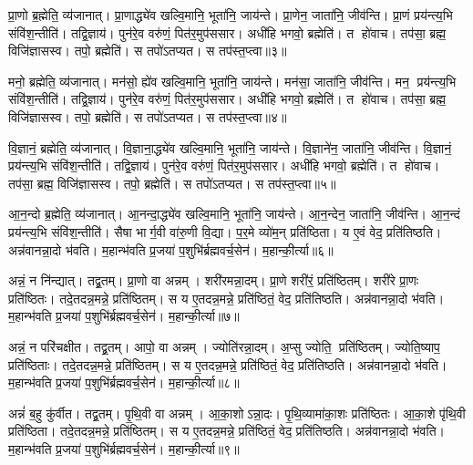 प्रा॒णो ब्र॒ह्मेति॒ व्य॑जानात्। प्रा॒णाद्ध्ये॑व खल्वि॒मानि॒ भूता॑नि॒ जाय॑न्ते। प्रा॒णेन॒ जाता॑नि॒ जीव॑न्ति। प्रा॒णं प्रय॑न्त्य॒भि  संवि॑श॒न्तीति॑। तद्वि॒ज्ञाय॑। पुन॑रे॒व वरु॑णं॒ पित॑र॒मुप॑ससार। अधी॑हि भगवो॒ ब्रह्मेति॑। त हो॑वाच। तप॑सा॒ ब्रह्म॒ विजि॑ज्ञासस्व। तपो॒ ब्रह्मेति॑। स तपो॑ऽतप्यत। स तप॑स्त॒प्त्वा॥३॥

मनो॒ ब्रह्मेति॒ व्य॑जानात्। मन॑सो॒ ह्ये॑व खल्वि॒मानि॒ भूता॑नि॒ जाय॑न्ते। मन॑सा॒ जाता॑नि॒ जीव॑न्ति। मन॒ प्रय॑न्त्य॒भि  संवि॑श॒न्तीति॑। तद्वि॒ज्ञाय॑। पुन॑रे॒व वरु॑णं॒ पित॑र॒मुप॑ससार। अधी॑हि भगवो॒ ब्रह्मेति॑। त हो॑वाच। तप॑सा॒ ब्रह्म॒ विजि॑ज्ञासस्व। तपो॒ ब्रह्मेति॑। स तपो॑ऽतप्यत। स तप॑स्त॒प्त्वा॥४॥

वि॒ज्ञानं॒ ब्रह्मेति॒ व्य॑जानात्। वि॒ज्ञाना॒द्ध्ये॑व खल्वि॒मानि॒ भूता॑नि॒ जाय॑न्ते। वि॒ज्ञाने॑न॒ जाता॑नि॒ जीव॑न्ति। वि॒ज्ञानं॒ प्रय॑न्त्य॒भि संवि॑श॒न्तीति॑। तद्वि॒ज्ञाय॑। पुन॑रे॒व वरु॑णं॒ पित॑र॒मुप॑ससार। अधी॑हि भगवो॒ ब्रह्मेति॑। त हो॑वाच। तप॑सा॒ ब्रह्म॒ विजि॑ज्ञासस्व। तपो॒ ब्रह्मेति॑। स तपो॑ऽतप्यत। स तप॑स्त॒प्त्वा॥५॥

आ॒न॒न्दो ब्र॒ह्मेति॒ व्य॑जानात्। आ॒नन्दा॒द्ध्ये॑व खल्वि॒मानि॒ भूता॑नि॒ जाय॑न्ते। आ॒न॒न्देन॒ जाता॑नि॒ जीव॑न्ति। आ॒न॒न्दं प्रय॑न्त्य॒भि संवि॑श॒न्तीति॑। सैषा भार्ग॒वी वा॑रु॒णी वि॒द्या। प॒र॒मे व्यो॑म॒न् प्रति॑ष्ठिता। य ए॒वं वेद॒ प्रति॑तिष्ठति। अन्न॑वानन्ना॒दो भ॑वति। म॒हान्भ॑वति प्र॒जया॑ प॒शुभि॑र्ब्रह्मवर्च॒सेन॑। म॒हान्की॒र्त्या॥६॥

अन्नं॒ न नि॑न्द्यात्। तद्व्र॒तम्। प्रा॒णो वा अन्नम्। शरी॑रमन्ना॒दम्। प्रा॒णे शरी॑रं॒ प्रति॑ष्ठितम्। शरी॑रे प्रा॒णः प्रति॑ष्ठितः। तदे॒तदन्न॒मन्ने॒ प्रति॑ष्ठितम्। स य ए॒तदन्न॒मन्ने॒ प्रति॑ष्ठितं॒ वेद॒ प्रति॑तिष्ठति। अन्न॑वानन्ना॒दो भ॑वति। म॒हान्भ॑वति प्र॒जया॑ प॒शुभि॑र्ब्रह्मवर्च॒सेन॑। म॒हान्की॒र्त्या॥७॥

अन्नं॒ न परि॑चक्षीत। तद्व्र॒तम्। आपो॒ वा अन्नम्। ज्योति॑रन्ना॒दम्। अ॒प्सु ज्योति॒ प्रति॑ष्ठितम्। ज्योति॒ष्याप॒ प्रति॑ष्ठिताः। तदे॒तदन्न॒मन्ने॒ प्रति॑ष्ठितम्। स य ए॒तदन्न॒मन्ने॒ प्रति॑ष्ठितं॒ वेद॒ प्रति॑तिष्ठति। अन्न॑वानन्ना॒दो भ॑वति। म॒हान्भ॑वति प्र॒जया॑ प॒शुभि॑र्ब्रह्मवर्च॒सेन॑। म॒हान्की॒र्त्या॥८॥

अन्नं॑ ब॒हु कु॑र्वीत। तद्व्र॒तम्। पृ॒थि॒वी वा अन्नम्। आ॒का॒शोऽन्ना॒दः। पृ॒थि॒व्यामा॑का॒शः प्रति॑ष्ठितः। आ॒का॒शे पृ॑थि॒वी प्रति॑ष्ठिता। तदे॒तदन्न॒मन्ने॒ प्रति॑ष्ठितम्। स य ए॒तदन्न॒मन्ने॒ प्रति॑ष्ठितं॒ वेद॒ प्रति॑तिष्ठति। अन्न॑वानन्ना॒दो भ॑वति। म॒हान्भ॑वति प्र॒जया॑ प॒शुभि॑र्ब्रह्मवर्च॒सेन॑। म॒हान्की॒र्त्या॥९॥


